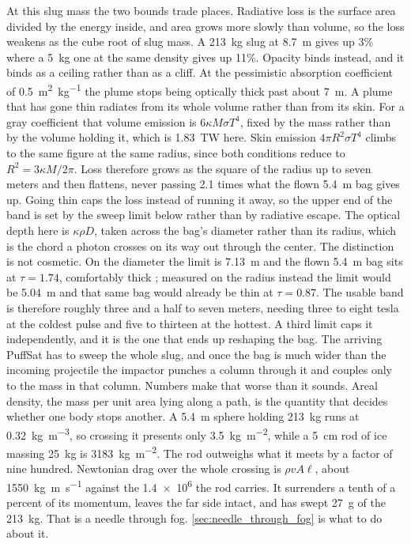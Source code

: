 \documentclass{article}
\begin{document}
At this slug mass the two bounds trade places. Radiative loss is the surface area divided by the energy inside, and area grows more slowly than volume, so the loss weakens as the cube root of slug mass. A \SI{213}{\kilogram} slug at \SI{8.7}{\meter} gives up 3\% where a \SI{5}{\kilogram} one at the same density gives up 11\%. Opacity binds instead, and it binds as a ceiling rather than as a cliff. At the pessimistic absorption coefficient of \SI{0.5}{\square\meter\per\kilogram} the plume stops being optically thick past about \SI{7}{\meter}. A plume that has gone thin radiates from its whole volume rather than from its skin. For a gray coefficient that volume emission is $6\kappa M\sigma T^4$, fixed by the mass rather than by the volume holding it, which is \SI{1.83}{\tera\watt} here. Skin emission $4\pi R^2\sigma T^4$ climbs to the same figure at the same radius, since both conditions reduce to $R^2 = 3\kappa M/2\pi$. Loss therefore grows as the square of the radius up to seven meters and then flattens, never passing \num{2.1} times what the flown \SI{5.4}{\meter} bag gives up. Going thin caps the loss instead of running it away, so the upper end of the band is set by the sweep limit below rather than by radiative escape. The optical depth here is $\kappa \rho D$, taken across the bag's diameter rather than its radius, which is the chord a photon crosses on its way out through the center. The distinction is not cosmetic. On the diameter the limit is \SI{7.13}{\meter} and the flown \SI{5.4}{\meter} bag sits at $\tau = 1.74$, comfortably thick \cite{Katz_aim_is_all_you_need_2025}; measured on the radius instead the limit would be \SI{5.04}{\meter} and that same bag would already be thin at $\tau = 0.87$. The usable band is therefore roughly three and a half to seven meters, needing three to eight tesla at the coldest pulse and five to thirteen at the hottest. A third limit caps it independently, and it is the one that ends up reshaping the bag. The arriving PuffSat has to sweep the whole slug, and once the bag is much wider than the incoming projectile the impactor punches a column through it and couples only to the mass in that column. Numbers make that worse than it sounds. Areal density, the mass per unit area lying along a path, is the quantity that decides whether one body stops another. A \SI{5.4}{\meter} sphere holding \SI{213}{\kilogram} runs at \SI{0.32}{\kilogram\per\cubic\meter}, so crossing it presents only \SI{3.5}{\kilogram\per\square\meter}, while a \SI{5}{\centi\meter} rod of ice massing \SI{25}{\kilogram} is \SI{3183}{\kilogram\per\square\meter}. The rod outweighs what it meets by a factor of nine hundred. Newtonian drag over the whole crossing is $\rho v A \ell$, about \SI{1550}{\kilogram\meter\per\second} against the \num{1.4e6} the rod carries. It surrenders a tenth of a percent of its momentum, leaves the far side intact, and has swept \SI{27}{\gram} of the \SI{213}{\kilogram}. That is a needle through fog. \autoref{sec:needle_through_fog} is what to do about it.
\end{document}
